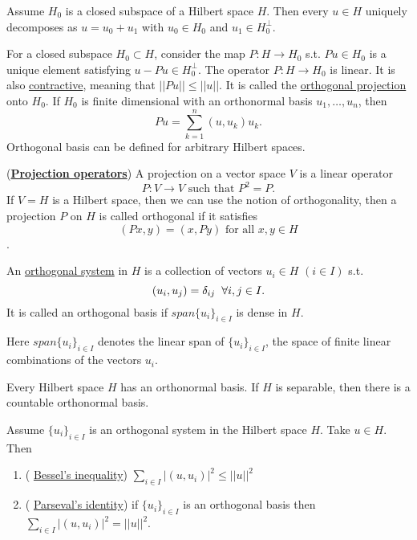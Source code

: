 \begin{proposition}
    Assume $H_0$ is a closed subspace of a Hilbert space $H$. Then every $u\in H$ uniquely decomposes as $u = u_0+u_1$ with $u_0\in H_0$ and $u_1\in H_0^\perp$.
\end{proposition}
For a closed subspace $H_0\subset H$, consider the map $P:H\rightarrow H_0$ s.t. $Pu\in H_0$ is a unique element satisfying $u-Pu\in H_0^\perp$.
The operator $P:H\rightarrow H_0$ is linear. It is also \underline{contractive}, meaning that $||Pu||\leq ||u||$. It is called the \underline{orthogonal projection} onto $H_0$.
If $H_0$ is finite dimensional with an orthonormal basis $u_1,\ldots,u_n$, then 
$$Pu = \sum_{k=1}^{n}(u,u_k)u_k.$$
Orthogonal basis can be defined for arbitrary Hilbert spaces. 
\begin{definition}(\underline{\textbf{Projection operators}})
    A projection on a vector space $V$ is a linear operator $$P:V\rightarrow V \text{ such that } P^2 = P.$$ If $V=H$ is a Hilbert space, then we can use the notion of orthogonality,
     then a projection $P$ on $H$ is called orthogonal if it satisfies $$(Px,y)=(x,Py) \text{ for all } x,y\in H$$.   
\end{definition}

\begin{definition}
    An \underline{orthogonal system} in $H$ is a collection of vectors $u_i\in H$ $(i\in I)$ s.t. 
    $$(u_i,u_j)=\delta_{ij}\hspace{2mm} \forall i,j\in I.$$
    It is called an orthogonal basis if $span\{u_i\}_{i\in I}$ is dense in $H$.

    Here $span\{u_i\}_{i\in I}$ denotes the linear span of $\{u_i\}_{i\in I}$, the space of finite linear combinations of the vectors $u_i$. 
\end{definition}

\begin{theorem}
    Every Hilbert space $H$ has an orthonormal basis. If $H$ is separable, then there is a countable orthonormal basis. 
\end{theorem}

\begin{proposition}
    Assume $\{u_i \}_{i\in I}$ is an orthogonal system in the Hilbert space $H$. Take $u\in H$. Then 
    \begin{enumerate}
        \item ( \underline{Bessel's inequality}) $\sum_{i\in I}|(u,u_i)|^2\leq ||u||^2$ 
        \item ( \underline{Parseval's identity}) if $\{u_i\}_{i\in I}$ is an orthogonal basis then $\sum_{i\in I}|(u,u_i)|^2 = ||u||^2$.
    \end{enumerate}
\end{proposition}

